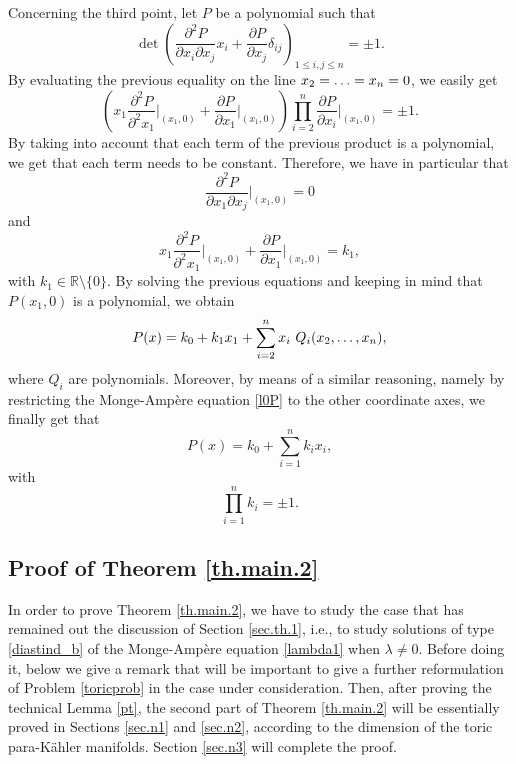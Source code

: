 \documentclass[11pt, reqno]{amsart}
\newcommand{\de}{\partial}
\newcommand{\R}{\mathds{R}}
\newcommand{\pk }{para-K\"{a}hler }
\begin{document}
\smallskip
Concerning the third point, let $P$ be  a polynomial such that
$$\det\left( \frac{\de^2 P}{\de x_i\de x_j}x_i+\frac{\de P}{\de x_j}\delta_{ij}\right)_{1\leq i,j\leq n}=\pm1.$$
By evaluating the previous equality on the line $x_2=\mathellipsis=x_n=0$, we easily get
\begin{equation}\label{l0P}
\left( x_1 \frac{\de^2 P}{\de^2 x_1}\Big|_{(x_1,0)}+\frac{\de P}{\de x_1}\Big|_{(x_1,0)}\right)\prod_{i=2}^n\frac{\de P}{\de x_i}\Big|_{(x_1,0)}=\pm1.\end{equation}
By taking into account that each term of the previous product is a polynomial, we get that each term needs to be  constant. Therefore, we have in particular that
$$\frac{\de^2 P}{\de x_1\de x_j}\Big|_{(x_1,0)}=0$$
and
$$ x_1 \frac{\de^2 P}{\de^2 x_1}\Big|_{(x_1,0)}+\frac{\de P}{\de x_1}\Big|_{(x_1,0)}=k_1,$$
with $k_1\in\R\setminus\{0\}$. By solving the previous equations and keeping in mind  that $P(x_1,0)$ is a polynomial, we obtain
$$P(x)=k_0+k_1x_1+\sum_{i=2}^n x_i \ Q_i(x_2,\mathellipsis,x_n),$$
where $Q_i$ are polynomials. Moreover, by means of a similar reasoning, namely by restricting the Monge-Ampère equation \eqref{l0P} to the other coordinate axes, we finally get that
$$P(x)=k_0+\sum_{i=1}^n k_i x_i ,$$
with $$\prod_{i=1}^nk_i=\pm 1.$$









\subsection{Proof of Theorem \ref{th.main.2}}\label{sec.th.2}

In order to prove Theorem \ref{th.main.2}, we have to study the case that has remained out the discussion of Section \ref{sec.th.1}, i.e., to study solutions of type  \eqref{diastind_b} of the Monge-Ampère equation \eqref{lambda1} when $\lambda\neq0$. Before doing it, below we give a remark that will be important to give  a further reformulation of Problem \ref{toricprob} in the case under consideration. Then, after proving the technical Lemma \ref{pt}, the second part of Theorem \ref{th.main.2} will be essentially proved in Sections \ref{sec.n1} and \ref{sec.n2}, according to the dimension of the toric \pk manifolds. Section \ref{sec.n3} will complete the proof. 
\end{document}
